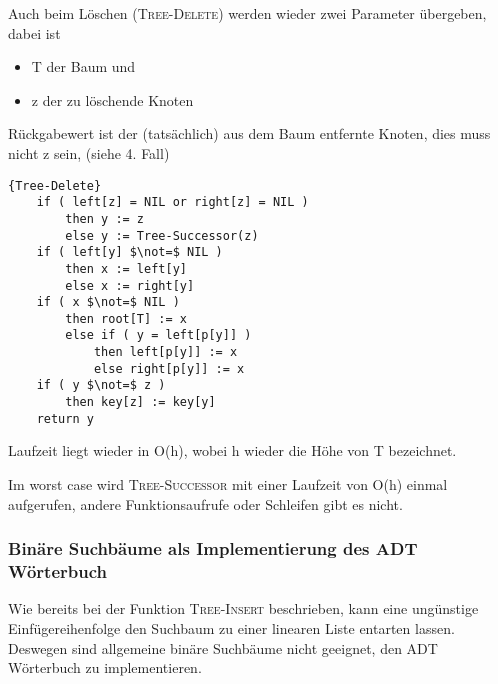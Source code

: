 \documentclass[ngerman,draft,parskip=half*,twoside]{scrreprt}
\theoremstyle{break}
\begin{document}
		Auch beim Löschen (\textsc{Tree-Delete}) werden wieder zwei Parameter übergeben, dabei ist
		\begin{itemize}
			\item T der Baum und
		 	\item z der zu löschende Knoten
		\end{itemize}
		Rückgabewert ist der (tatsächlich) aus dem Baum entfernte Knoten, dies muss nicht z sein, (siehe 4. Fall)
		\begin{Algorithmus}
                        \begin{lstlisting}[frame=tlrb, mathescape=true, title=\textsc{Tree-Delete}, gobble=4]{Tree-Delete}
	if ( left[z] = NIL or right[z] = NIL )
		then y := z
		else y := Tree-Successor(z)
	if ( left[y] $\not=$ NIL )
		then x := left[y]
		else x := right[y]
	if ( x $\not=$ NIL )
		then root[T] := x
		else if ( y = left[p[y]] )
			then left[p[y]] := x
			else right[p[y]] := x
	if ( y $\not=$ z )
		then key[z] := key[y]
	return y
			\end{lstlisting}

		Laufzeit liegt wieder in O(h), wobei  h wieder die Höhe von T bezeichnet.
		\end{Algorithmus}		

		Im worst case wird \textsc{Tree-Successor} mit einer Laufzeit von O(h) einmal aufgerufen, 
		andere Funktionsaufrufe oder Schleifen gibt es nicht.
\subsubsection{Binäre Suchbäume als Implementierung des ADT Wörterbuch}
 		\centering
	  	Wie bereits bei der Funktion \textsc{Tree-Insert} beschrieben, kann eine ungünstige 
	  	Einfügereihenfolge den Suchbaum zu einer linearen Liste entarten lassen. Deswegen sind allgemeine 
	  	binäre Suchbäume nicht geeignet, den ADT Wörterbuch zu implementieren.  	
\end{document}
